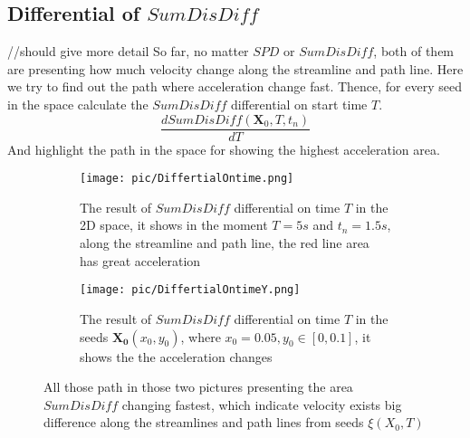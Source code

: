 \documentclass[
     11pt,         %
     a4paper,      %
     oneside,
     ]{article}
\newcommand{\vect}[1]{\boldsymbol{#1}}
\begin{document}
\subsection{Differential of $SumDisDiff$}//should give more detail
So far, no matter $SPD$ or $SumDisDiff$, both of them are presenting how much velocity change along the streamline and path line. Here we try to find out the path where acceleration change fast. Thence, for every seed in the space calculate the $SumDisDiff$ differential on start time $T$.
$$\frac{d SumDisDiff(\vect{X}_{0},T,t_{n})}{d T}$$ And highlight the path in the space for showing the highest acceleration area.
 \begin{figure}[H]
 	\centering
 	\begin{subfigure}{0.45\textwidth}
 		\centering
 		\texttt{[image: pic/DiffertialOntime.png]}
 		\caption{ The result of $SumDisDiff$ differential on time $T$ in the 2D space, it shows in the moment $T=5s$ and $t_{n}=1.5s$, along the streamline and path line, the red line area has great acceleration}
 	\end{subfigure}	
 	\begin{subfigure}{0.45\textwidth}
 		\centering
 		\texttt{[image: pic/DiffertialOntimeY.png]}
 		\caption{ The result of $SumDisDiff$ differential on time $T$ in the seeds $\vect{X_{0}}(x_{0},y_{0})$, where $ x_{0}=0.05, y_{0}\in[0,0.1] $, it shows the the acceleration changes}
 	\end{subfigure}	
 	\caption{All those path in those two pictures presenting the area $SumDisDiff$ changing fastest, which indicate velocity exists big difference along the streamlines and path lines from seeds $\xi(X_{0},T)$  }
 	\label{fig:SumDisDiffDifferetialResult}
 \end{figure}
\end{document}
